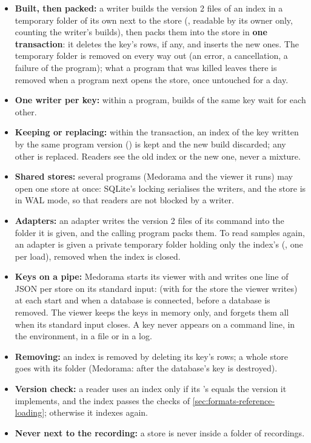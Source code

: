 \begin{itemize}
\item \textbf{Built, then packed:} a writer builds the version 2 files of an index in a temporary
  folder of its own next to the store (, readable by
  its owner only,  counting the writer's builds), then packs them into the store in
  \textbf{one transaction}: it deletes the key's rows, if any, and inserts the new ones. The
  temporary folder is removed on every way out (an error, a cancellation, a failure of the
  program); what a program that was killed leaves there is removed when a program next opens the
  store, once untouched for a day.
\item \textbf{One writer per key:} within a program, builds of the same key wait for each other.
\item \textbf{Keeping or replacing:} within the transaction, an index of the key written by the
  same program version () is kept and the new build discarded; any other is
  replaced. Readers see the old index or the new one, never a mixture.
\item \textbf{Shared stores:} several programs (Medorama and the viewer it runs) may open one
  store at once: SQLite's locking serialises the writers, and the store is in WAL mode, so that
  readers are not blocked by a writer.
\item \textbf{Adapters:} an adapter writes the version 2 files of its  command into
  the folder it is given, and the calling program packs them. To read samples again, an adapter
  is given a private temporary folder holding only the index's 
  (, one per load), removed when the index is closed.
\item \textbf{Keys on a pipe:} Medorama starts its viewer with  and writes
  one line of JSON per store on its standard input:  (with
   for the store the viewer writes) at each start and when a database is
  connected,  before a database is removed. The viewer keeps the keys in
  memory only, and forgets them all when its standard input closes. A key never appears on a
  command line, in the environment, in a file or in a log.
\item \textbf{Removing:} an index is removed by deleting its key's rows; a whole store goes with
  its folder (Medorama: after the database's key is destroyed).
\item \textbf{Version check:} a reader uses an index only if its 's
   equals the version it implements, and the index passes the checks of
  \cref{sec:formats-reference-loading}; otherwise it indexes again.
\item \textbf{Never next to the recording:} a store is never inside a folder of recordings.
\end{itemize}

